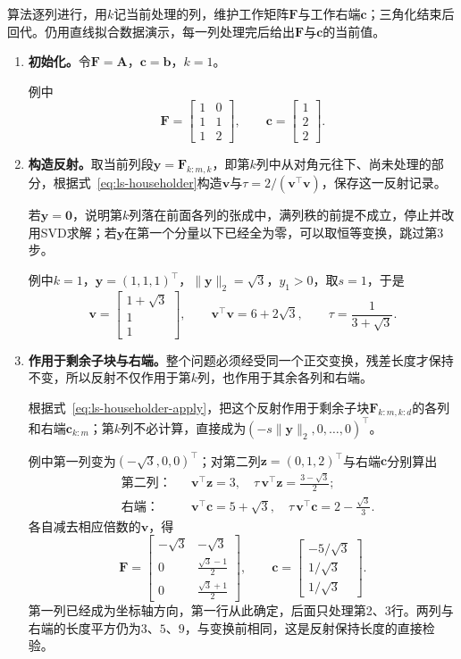 算法逐列进行，用$k$记当前处理的列，维护工作矩阵$\bm F$与工作右端$\bm c$；三角化结束后回代。仍用直线拟合数据演示，每一列处理完后给出$\bm F$与$\bm c$的当前值。
\begin{enumerate}
 \item \textbf{初始化。}令$\bm F=\bm A$，$\bm c=\bm b$，$k=1$。

 例中
 \[
  \bm F=\begin{bmatrix}1&0\\1&1\\1&2\end{bmatrix},\qquad
  \bm c=\begin{bmatrix}1\\2\\2\end{bmatrix}.
 \]

 \item \textbf{构造反射。}取当前列段$\bm y=\bm F_{k:m,k}$，即第$k$列中从对角元往下、尚未处理的部分，根据式~\eqref{eq:ls-householder}构造$\bm v$与$\tau=2/(\bm v^\top\bm v)$，保存这一反射记录。
 
 若$\bm y=\bm0$，说明第$k$列落在前面各列的张成中，满列秩的前提不成立，停止并改用SVD求解；若$\bm y$在第一个分量以下已经全为零，可以取恒等变换，跳过第3步。

 例中$k=1$，$\bm y=(1,1,1)^\top$，$\lVert\bm y\rVert_2=\sqrt3$，$y_1>0$，取$s=1$，于是
 \[
  \bm v=\begin{bmatrix}1+\sqrt3\\1\\1\end{bmatrix},\qquad \bm v^\top\bm v=6+2\sqrt3,\qquad \tau=\frac1{3+\sqrt3}.
 \]

 \item \textbf{作用于剩余子块与右端。}整个问题必须经受同一个正交变换，残差长度才保持不变，所以反射不仅作用于第$k$列，也作用于其余各列和右端。
 
 根据式~\eqref{eq:ls-householder-apply}，把这个反射作用于剩余子块$\bm F_{k:m,k:d}$的各列和右端$\bm c_{k:m}$；第$k$列不必计算，直接成为$(-s\lVert\bm y\rVert_2,0,\ldots,0)^\top$。

 例中第一列变为$(-\sqrt3,0,0)^\top$；对第二列$\bm z=(0,1,2)^\top$与右端$\bm c$分别算出
 \[
  \begin{aligned}
  &\text{第二列：}&& \bm v^\top\bm z=3,\quad \tau\,\bm v^\top\bm z=\tfrac{3-\sqrt3}2;\\
  &\text{右端：}&& \bm v^\top\bm c=5+\sqrt3,\quad \tau\,\bm v^\top\bm c=2-\tfrac{\sqrt3}3 .
  \end{aligned}
 \]
 各自减去相应倍数的$\bm v$，得
 \[
  \bm F=\begin{bmatrix}-\sqrt3&-\sqrt3\\0&\frac{\sqrt3-1}2\\[2pt]0&\frac{\sqrt3+1}2\end{bmatrix},\qquad
  \bm c=\begin{bmatrix}-5/\sqrt3\\1/\sqrt3\\1/\sqrt3\end{bmatrix}.
 \]
 第一列已经成为坐标轴方向，第一行从此确定，后面只处理第2、3行。两列与右端的长度平方仍为$3$、$5$、$9$，与变换前相同，这是反射保持长度的直接检验。


\end{enumerate}
